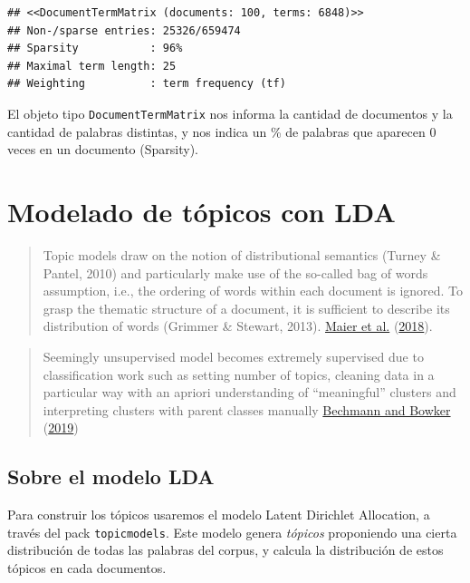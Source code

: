 \documentclass[
]{book}
\begin{document}
\begin{verbatim}
## <<DocumentTermMatrix (documents: 100, terms: 6848)>>
## Non-/sparse entries: 25326/659474
## Sparsity           : 96%
## Maximal term length: 25
## Weighting          : term frequency (tf)
\end{verbatim}

El objeto tipo \texttt{DocumentTermMatrix} nos informa la cantidad de documentos y la cantidad de palabras distintas, y nos indica un \% de palabras que aparecen 0 veces en un documento (Sparsity).

\hypertarget{modelado-de-tuxf3picos-con-lda}{%
\section{Modelado de tópicos con LDA}\label{modelado-de-tuxf3picos-con-lda}}

\begin{quote}
Topic models draw on the notion of distributional semantics (Turney \& Pantel, 2010) and particularly make use of the so-called bag of words assumption, i.e., the ordering of words within each document is ignored. To grasp the thematic structure of a document, it is sufficient to describe its distribution of words (Grimmer \& Stewart, 2013).
\protect\hyperlink{ref-Maier2018}{Maier et al.} (\protect\hyperlink{ref-Maier2018}{2018}).
\end{quote}

\begin{quote}
Seemingly unsupervised model becomes extremely supervised due to classification work such as setting number of topics, cleaning data in a particular way with an apriori understanding of ``meaningful'' clusters and interpreting clusters with parent classes manually
\protect\hyperlink{ref-Bechmann2019}{Bechmann and Bowker} (\protect\hyperlink{ref-Bechmann2019}{2019})
\end{quote}

\hypertarget{sobre-el-modelo-lda}{%
\subsection{Sobre el modelo LDA}\label{sobre-el-modelo-lda}}

Para construir los tópicos usaremos el modelo Latent Dirichlet Allocation, a través del pack \texttt{topicmodels}. Este modelo genera \emph{tópicos} proponiendo una cierta distribución de todas las palabras del corpus, y calcula la distribución de estos tópicos en cada documentos.
\end{document}
